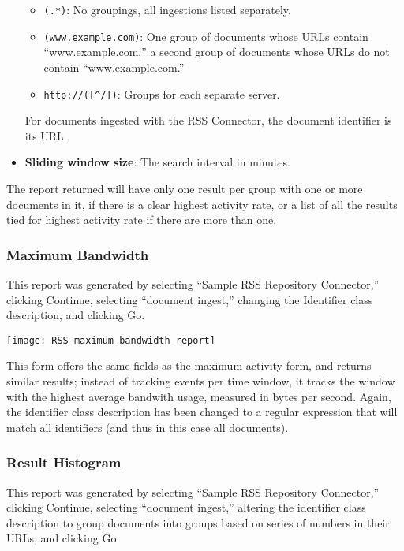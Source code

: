 \begin{changemargin}{1.5in}{0in}
\begin{itemize}
\begin{itemize}
\item \texttt{(.*)}: No groupings, all ingestions listed separately.

\item \texttt{(www.example.com)}: One group of documents whose URLs contain ``www.example.com,'' a second group of documents whose URLs do not contain ``www.example.com.''

\item \texttt{http://([\^{}/])}: Groups for each separate server.

\end{itemize}

For documents ingested with the RSS Connector, the document identifier
is its URL.

\item \textbf{Sliding window size}: The search interval in minutes.

\end{itemize}

The report returned will have only one result per group with one or more
documents in it, if there is a clear highest activity rate, or a list of
all the results tied for highest activity rate if there are more than one.

\subsubsection{Maximum Bandwidth}

This report was generated by selecting ``Sample RSS Repository Connector,''
clicking Continue, selecting ``document ingest,'' changing the Identifier
class description, and clicking Go.

\texttt{[image: RSS-maximum-bandwidth-report]}

This form offers the same fields as the maximum activity form, and
returns similar results; instead of tracking events per time window,
it tracks the window with the highest average bandwith usage, measured
in bytes per second. Again, the identifier class description has been
changed to a regular expression that will match all identifiers (and
thus in this case all documents).

\subsubsection{Result Histogram}

This report was generated by selecting ``Sample RSS Repository
Connector,'' clicking Continue, selecting ``document ingest,''
altering the identifier class description to group documents into
groups based on series of numbers in their URLs, and clicking Go.


\end{changemargin}

